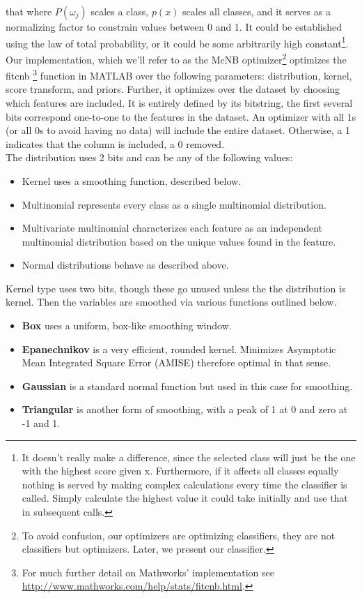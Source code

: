 that where $P(\omega_j)$ scales a class, $p(x)$ scales all classes, and it
serves as a normalizing factor to constrain values between 0 and 1.  It could
be established using the law of total probability, or it could be some
arbitrarily high constant\footnote{It doesn't really make a difference, since the selected class will just be the one with the highest score given x. 	Furthermore, if it affects all classes equally nothing is served by making
complex calculations every time the classifier is called.  Simply calculate the highest value it could take initially and use that in subsequent calls.}.  \\Our implementation, which we'll refer to as the McNB optimizer\footnote{To avoid confusion, our optimizers are optimizing classifiers, they are not classifiers but optimizers.  Later, we present our classifier.} optimizes the fitcnb  \footnote{For much further
detail on Mathworks' implementation see
\url{http://www.mathworks.com/help/stats/fitcnb.html}.} function in MATLAB over the following parameters: distribution, kernel, score transform, and priors.  Further, it optimizes over the dataset by choosing which features are included.  It is entirely defined by its bitstring, the first several bits correspond one-to-one to the features in the dataset.  An optimizer with all 1s (or all 0s to avoid having no data) will include the entire dataset.  Otherwise, a 1 indicates that the column is included, a 0 removed.
  \\
The distribution uses 2 bits and can be any of the following values:\\
\begin{itemize}
	\item Kernel uses a smoothing function, described below.\item	Multinomial represents every class as a single multinomial distribution.
	\item	Multivariate multinomial characterizes each feature as an independent
	multinomial distribution based on the unique values found in the feature.
	\item	Normal distributions behave as described above.
\end{itemize}
Kernel type uses two bits, though these go unused unless the the distribution is
kernel.  Then the variables are smoothed via various functions outlined below.
\begin{itemize}
	\item \textbf{Box} uses a uniform, box-like smoothing window.
	\item \textbf{Epanechnikov} is a very efficient, rounded kernel.  Minimizes
	Asymptotic Mean Integrated Square Error (AMISE)\citep{stefanie_scheid_introduction_2004} therefore optimal
	in that sense.
	\item \textbf{Gaussian} is a standard normal function but used in this case for
	smoothing.
	\item \textbf{Triangular} is another form of smoothing, with a peak of 1 at 0
	and zero at -1 and 1.
\end{itemize}
